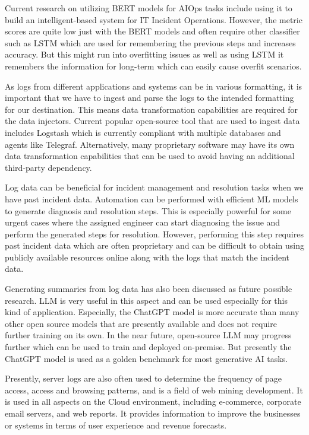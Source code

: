\documentclass[conference]{IEEEtran}
\begin{document}
Current research on utilizing BERT models for AIOps tasks include using it to build an intelligent-based system for IT Incident Operations. However, the metric scores are quite low just with the BERT models and often require other classifier such as LSTM which are used for remembering the previous steps and increases accuracy. But this might run into overfitting issues as well as using LSTM it remembers the information for long-term which can easily cause overfit scenarios. \cite{Souce https://ieeexplore.ieee.org/stamp/stamp.jsp?tp=&arnumber=10189040}

As logs from different applications and systems can be in various formatting, it is important that we have to ingest and parse the logs to the intended formatting for our destination. This means data transformation capabilities are required for the data injectors. Current popular open-source tool that are used to ingest data includes Logstash which is currently compliant with multiple databases and agents like Telegraf. Alternatively, many proprietary software may have its own data transformation capabilities that can be used to avoid having an additional third-party dependency. \cite{Souce https://browse.arxiv.org/pdf/2308.11225.pdf}

Log data can be beneficial for incident management and resolution tasks when we have past incident data. Automation can be performed with efficient ML models to generate diagnosis and resolution steps. This is especially powerful for some urgent cases where the assigned engineer can start diagnosing the issue and perform the generated steps for resolution. However, performing this step requires past incident data which are often proprietary and can be difficult to obtain using publicly available resources online along with the logs that match the incident data. \cite{Souce https://browse.arxiv.org/pdf/2308.11225.pdf}

Generating summaries from log data has also been discussed as future possible research. LLM is very useful in this aspect and can be used especially for this kind of application. Especially, the ChatGPT model is more accurate than many other open source models that are presently available and does not require further training on its own. In the near future, open-source LLM may progress further which can be used to train and deployed on-premise. But presently the ChatGPT model is used as a golden benchmark for most generative AI tasks.\cite{Souce https://browse.arxiv.org/pdf/2308.11225.pdf} 

Presently, server logs are also often used to determine the frequency of page access, access and browsing patterns, and is a field of web mining development. It is used in all aspects on the Cloud environment, including e-commerce, corporate email servers, and web reports. It provides information to improve the businesses or systems in terms of user experience and revenue forecasts. \cite{Source https://ieeexplore.ieee.org/stamp/stamp.jsp?tp=&arnumber=9898279}
\end{document}
